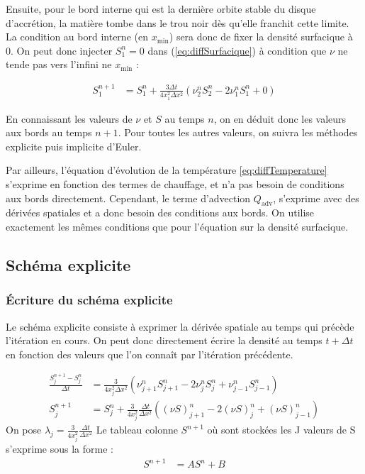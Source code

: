 \documentclass[a4paper,12pt]{article}
\begin{document}
Ensuite, pour le bord interne qui est la dernière orbite stable du disque d'accrétion, la matière tombe dans le trou noir dès qu'elle franchit cette limite. La condition au bord interne (en $x_\text{min}$) sera donc de fixer la densité surfacique à 0. On peut donc injecter $S_1^n = 0$ dans (\ref{eq:diffSurfacique}) à condition que $\nu$ ne tende pas vers l'infini ne $x_\text{min}$ : 

\begin{align}
S^{n+1}_1 &= S^n_1 + \frac{3\Delta t}{4x_1^2\Delta x^2}\left(\nu_2^nS_2^n - 2\nu_1^nS_1^n +0\right)
\end{align}

En connaissant les valeurs de $\nu$ et $S$ au temps $n$, on en déduit donc les valeurs aux bords au temps $n+1$. Pour toutes les autres valeurs, on suivra les méthodes explicite puis implicite d'Euler.

Par ailleurs, l'équation d'évolution de la température \ref{eq:diffTemperature} s'exprime en fonction des termes de chauffage, et n'a pas besoin de conditions aux bords directement.
Cependant, le terme d'advection $Q_\text{adv}$, s'exprime avec des dérivées spatiales et a donc besoin des conditions aux bords. On utilise exactement les mêmes conditions que pour l'équation sur la densité surfacique.

\subsection{Schéma explicite}
\subsubsection{Écriture du schéma explicite}

Le schéma explicite consiste à exprimer la dérivée spatiale au temps qui précède l'itération en cours. On peut donc directement écrire la densité au temps $t+\Delta t$ en fonction des valeurs que l'on connaît par l'itération précédente.

\begin{align}
 	\frac{S^{n+1}_j - S^n_j}{\Delta t} &= \frac{3}{4x_j^2\Delta x^2}\left(\nu^n_{j+1}S^n_{j+1} - 2\nu_j^nS_j^n + \nu^n_{j-1}S^n_{j-1}\right)\\
	S^{n+1}_j &= S_j^n + \frac{3}{4x_j^2}\frac{\Delta t}{\Delta x^2}\left((\nu S)^n_{j+1} - 2(\nu S)_j^n + (\nu S)^n_{j-1}\right)
\end{align}
On pose $\lambda_j = \frac{3}{4x_j^2}\frac{\Delta t}{\Delta x^2}$
Le tableau colonne $S^{n+1}$ où sont stockées les J valeurs de S s'exprime sous la forme :
\begin{align}
S^{n+1} &= AS^n + B
\end{align}
\end{document}
